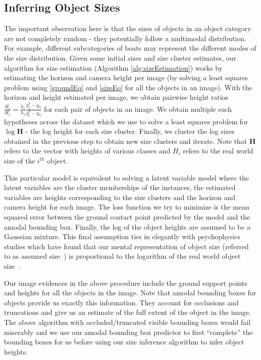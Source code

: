 \subsection{Inferring Object Sizes} 
The important observation here is that the sizes of objects in an object category are not completely random - they potentially follow a multimodal distribution. For example, different subcategories of boats may represent the different modes of the size distribution. Given some initial sizes and size cluster estimates, our algorithm for size estimation (Algorithm \ref{alg:sizeEstimation}) works by estimating the horizon and camera height per image (by solving a least squares problem using \eqref{groundEq} and \eqref{sizeEq} for all the objects in an image). With the horizon and height estimated per image, we obtain pairwise height ratios $\frac{H_i}{H_j} = \frac{h_i}{h_j}\frac{y_j^b-y_h}{y_i^b-y_h}$ for each pair of objects in an image. We obtain multiple such hypotheses across the dataset which we use to solve a least squares problem for $\log \mathbf{H}$ - the log height for each size cluster. Finally, we cluster the log sizes obtained in the previous step to obtain new size clusters and iterate. Note that $\mathbf{H}$ refers to the vector with heights of various classes and $H_i$ refers to the real world size of the $i^{th}$ object.

This particular model is equivalent to solving a latent variable model where the latent variables are the cluster memberships of the instances, the estimated variables are heights corresponding to the size clusters and the horizon and camera height for each image. The loss function we try to minimize is the mean squared error between the ground contact point predicted by the model and the amodal bounding box. Finally, the log of the object heights are assumed to be a Gaussian mixture. This final assumption ties in elegantly with psychophysics studies which have found that our mental representation of object size (referred to as assumed size~\cite{ittelson1951size,baird1963retinal,epstein1963influence}) is proportional to the logarithm of the real world object size~\cite{konkle2011canonical}.

Our image evidences in the above procedure include the ground support points and heights for all the objects in the image. Note that amodal bounding boxes for objects provide us exactly this information. They account for occlusions and truncations and give us an estimate of the full extent of the object in the image. The above algorithm with occluded/truncated visible bounding boxes would fail miserably and we use our amodal bounding box predictor to first ``complete'' the bounding boxes for us before using our size inference algorithm to infer object heights.


